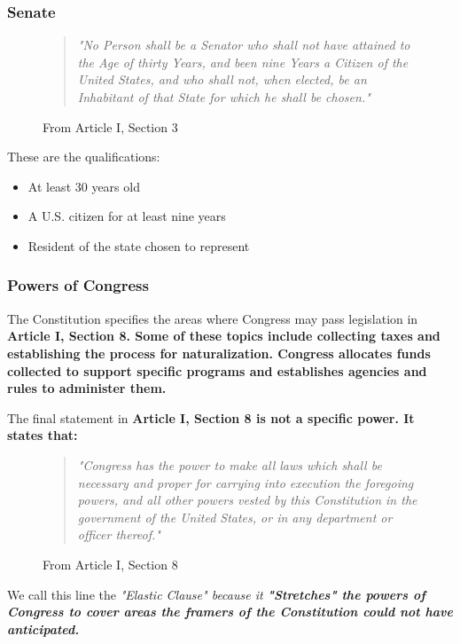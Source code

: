 \subsubsection*{Senate}

\begin{figure}[h]
    \begin{quote}
        \it{"No Person shall be a Senator who shall not have attained to the Age of thirty Years, and been nine Years a Citizen of the United States, and who shall not, when elected, be an Inhabitant of that State for which he shall be chosen."}
    \end{quote}
    \caption{From Article I, Section 3}
\end{figure}

These are the qualifications:

\begin{itemize}
    \item At least 30 years old
    \item A U.S. citizen for at least nine years
    \item Resident of the state chosen to represent
\end{itemize}

\subsubsection*{Powers of Congress}

The Constitution specifies the areas where Congress may pass legislation in \bf{Article I, Section 8}. Some of these topics include collecting taxes and establishing the process for naturalization. Congress allocates funds collected to support specific programs and establishes agencies and rules to administer them.

The final statement in \bf{Article I, Section 8} is not a specific power. It states that:

\begin{figure}[h]
    \begin{quote}
        \it{"Congress has the power to make all laws which shall be necessary and proper for carrying into execution the foregoing powers, and all other powers vested by this Constitution in the government of the United States, or in any department or officer thereof."}
    \end{quote}
    \caption{From Article I, Section 8}
\end{figure}

We call this line the \it{"Elastic Clause"} because it \bf{"Stretches"} the powers of Congress to cover areas the framers of the Constitution could not have anticipated.


